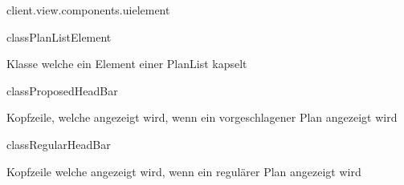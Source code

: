 \begin{texdocpackage}{client.view.components.uielement}
\begin{texdocclass}{class}{PlanListElement}
\label{texdoclet:edu.kit.informatik.studyplan.client.view.components.uielement.PlanListElement}
\begin{texdocclassintro}
Klasse welche ein Element einer PlanList kapselt\end{texdocclassintro}
\begin{texdocclassconstructors}
\end{texdocclassconstructors}
\begin{texdocclassmethods}
\end{texdocclassmethods}
\end{texdocclass}


\begin{texdocclass}{class}{ProposedHeadBar}
\label{texdoclet:edu.kit.informatik.studyplan.client.view.components.uielement.ProposedHeadBar}
\begin{texdocclassintro}
Kopfzeile, welche angezeigt wird, wenn ein vorgeschlagener Plan angezeigt
 wird\end{texdocclassintro}
\begin{texdocclassconstructors}
\end{texdocclassconstructors}
\end{texdocclass}


\begin{texdocclass}{class}{RegularHeadBar}
\label{texdoclet:edu.kit.informatik.studyplan.client.view.components.uielement.RegularHeadBar}
\begin{texdocclassintro}
Kopfzeile welche angezeigt wird, wenn ein regulärer Plan angezeigt wird\end{texdocclassintro}
\begin{texdocclassconstructors}
\end{texdocclassconstructors}
\begin{texdocclassmethods}
\end{texdocclassmethods}
\end{texdocclass}



\end{texdocpackage}

